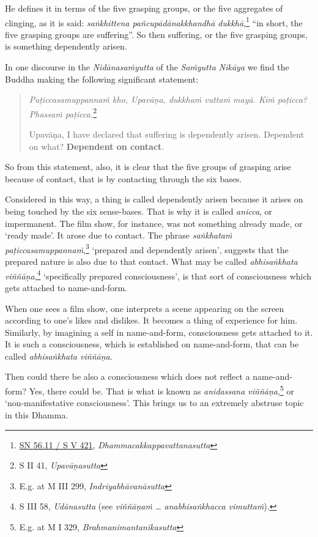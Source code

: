 He defines it in terms of the five grasping groups, or the five aggregates of clinging, as it is said: \emph{saṅkhittena pañcupādānakkhandhā dukkhā},\footnote{\href{https://suttacentral.net/sn56.11/pli/ms}{SN 56.11 / S V 421}, \emph{Dhammacakkappavattanasutta}} ``in short, the five grasping groups are suffering''. So then suffering, or the five grasping groups, is something dependently arisen.

In one discourse in the \emph{Nidānasaṁyutta} of the \emph{Saṁyutta Nikāya} we find the Buddha making the following significant statement:

\begin{quote}
\emph{Paṭiccasamuppannaṁ kho, Upavāṇa, dukkhaṁ vuttaṁ mayā. Kiṁ paṭicca? Phassaṁ paṭicca.}\footnote{S II 41, \emph{Upavāṇasutta}}

Upavāṇa, I have declared that suffering is dependently arisen. Dependent on what? \textbf{Dependent on contact}.
\end{quote}

So from this statement, also, it is clear that the five groups of grasping arise because of contact, that is by contacting through the six bases.

Considered in this way, a thing is called dependently arisen because it arises on being touched by the six sense-bases. That is why it is called \emph{anicca}, or impermanent. The film show, for instance, was not something already made, or `ready made'. It arose due to contact. The phrase \emph{saṅkhataṁ paṭiccasamuppannaṁ},\footnote{E.g. at M III 299, \emph{Indriyabhāvanāsutta}} `prepared and dependently arisen', suggests that the prepared nature is also due to that contact. What may be called \emph{abhisaṅkhata viññāṇa},\footnote{S III 58, \emph{Udānasutta} (see \emph{viññāṇaṁ \ldots{} anabhisaṅkhacca vimuttaṁ}).} `specifically prepared consciousness', is that sort of consciousness which gets attached to name-and-form.

When one sees a film show, one interprets a scene appearing on the screen according to one's likes and dislikes. It becomes a thing of experience for him. Similarly, by imagining a self in name-and-form, consciousness gets attached to it. It is such a consciousness, which is established on name-and-form, that can be called \emph{abhisaṅkhata viññāṇa}.

Then could there be also a consciousness which does not reflect a name-and-form? Yes, there could be. That is what is known as \emph{anidassana viññāṇa},\footnote{E.g. at M I 329, \emph{Brahmanimantanikasutta}} or `non-manifestative consciousness'. This brings us to an extremely abstruse topic in this Dhamma.

